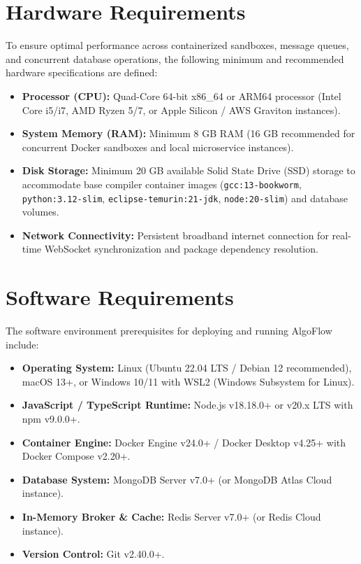 \documentclass[12pt,a4paper]{report}
\begin{document}
\section{Hardware Requirements}
To ensure optimal performance across containerized sandboxes, message queues, and concurrent database operations, the following minimum and recommended hardware specifications are defined:
\begin{itemize}[leftmargin=*]
  \item \textbf{Processor (CPU):} Quad-Core 64-bit x86\_64 or ARM64 processor (Intel Core i5/i7, AMD Ryzen 5/7, or Apple Silicon / AWS Graviton instances).
  \item \textbf{System Memory (RAM):} Minimum 8 GB RAM (16 GB recommended for concurrent Docker sandboxes and local microservice instances).
  \item \textbf{Disk Storage:} Minimum 20 GB available Solid State Drive (SSD) storage to accommodate base compiler container images (\texttt{gcc:13-bookworm}, \texttt{python:3.12-slim}, \texttt{eclipse-temurin:21-jdk}, \texttt{node:20-slim}) and database volumes.
  \item \textbf{Network Connectivity:} Persistent broadband internet connection for real-time WebSocket synchronization and package dependency resolution.
\end{itemize}

\section{Software Requirements}
The software environment prerequisites for deploying and running AlgoFlow include:
\begin{itemize}[leftmargin=*]
  \item \textbf{Operating System:} Linux (Ubuntu 22.04 LTS / Debian 12 recommended), macOS 13+, or Windows 10/11 with WSL2 (Windows Subsystem for Linux).
  \item \textbf{JavaScript / TypeScript Runtime:} Node.js v18.18.0+ or v20.x LTS with npm v9.0.0+.
  \item \textbf{Container Engine:} Docker Engine v24.0+ / Docker Desktop v4.25+ with Docker Compose v2.20+.
  \item \textbf{Database System:} MongoDB Server v7.0+ (or MongoDB Atlas Cloud instance).
  \item \textbf{In-Memory Broker \& Cache:} Redis Server v7.0+ (or Redis Cloud instance).
  \item \textbf{Version Control:} Git v2.40.0+.
\end{itemize}
\end{document}
